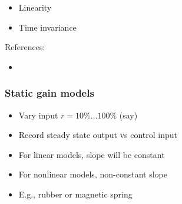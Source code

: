 \documentclass{beamer-control}
\begin{document}

\begin{SUMMARY}
\begin{itemize}
\item Linearity
\item Time invariance
\end{itemize}
\vfill References:
\begin{itemize}
\item {}
\end{itemize}
\end{SUMMARY}




\begin{frame}
\frametitle{Static gain models}
\begin{itemize}
\item Vary input $r=10\%\dots100\%$ (say)
\item Record steady state output vs control input
\item For linear models, slope will be constant
\item For nonlinear models, non-constant slope
\item E.g., rubber or magnetic spring
\end{itemize}
\end{frame}
\end{document}
